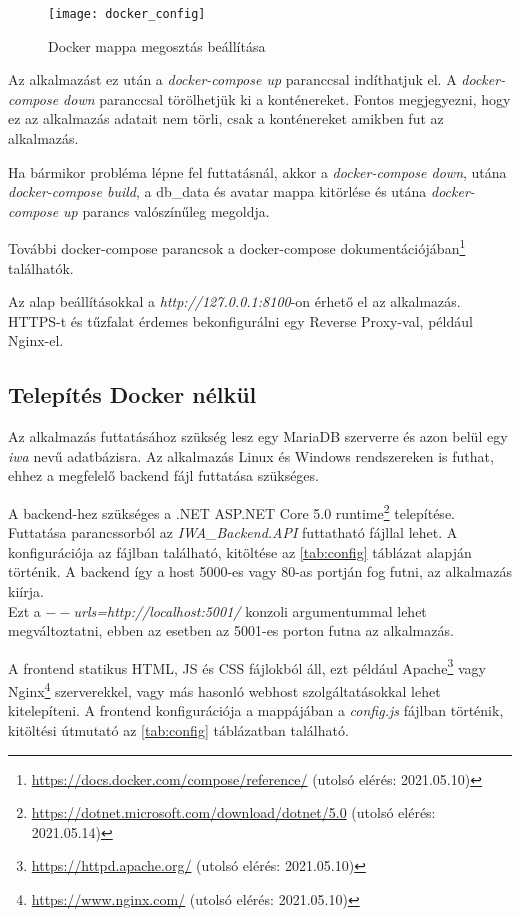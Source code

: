\begin{figure}[H]
    \centering
    \texttt{[image: docker\_config]}
    \caption{Docker mappa megosztás beállítása}
\end{figure}

Az alkalmazást ez után a \textit{docker-compose up} paranccsal indíthatjuk el. A \textit{docker-compose down} paranccsal törölhetjük ki a konténereket. Fontos megjegyezni, hogy ez az alkalmazás adatait nem törli, csak a konténereket amikben fut az alkalmazás.

Ha bármikor probléma lépne fel futtatásnál, akkor a \textit{docker-compose down}, utána \textit{docker-compose build}, a db\_data és avatar mappa kitörlése és utána \textit{docker-compose up} parancs valószínűleg megoldja.

További docker-compose parancsok a docker-compose dokumentációjában\footnote{\url{https://docs.docker.com/compose/reference/} (utolsó elérés: 2021.05.10)} találhatók.

Az alap beállításokkal a \textit{http://127.0.0.1:8100}-on érhető el az alkalmazás. HTTPS-t és tűzfalat érdemes bekonfigurálni egy Reverse Proxy\cite{nginxReverseProxy}-val, például Nginx-el.

\subsection{Telepítés Docker nélkül}

Az alkalmazás futtatásához szükség lesz egy MariaDB szerverre és azon belül egy \textit{iwa} nevű adatbázisra. Az alkalmazás Linux és Windows rendszereken is futhat, ehhez a megfelelő backend fájl futtatása szükséges.

A backend-hez szükséges a .NET ASP.NET Core 5.0 runtime\footnote{\url{https://dotnet.microsoft.com/download/dotnet/5.0} (utolsó elérés: 2021.05.14)} telepítése. Futtatása parancssorból az \textit{IWA\_Backend.API} futtatható fájllal lehet. A konfigurációja az  fájlban található, kitöltése az \ref{tab:config} táblázat alapján történik. A backend így a host 5000-es vagy 80-as portján fog futni, az alkalmazás kiírja. \\ Ezt a \textit{$--$urls=http://localhost:5001/} konzoli argumentummal lehet megváltoztatni, ebben az esetben az 5001-es porton futna az alkalmazás.

A frontend statikus HTML, JS és CSS fájlokból áll, ezt például Apache\footnote{\url{https://httpd.apache.org/} (utolsó elérés: 2021.05.10)} vagy Nginx\footnote{\url{https://www.nginx.com/} (utolsó elérés: 2021.05.10)} szerverekkel, vagy más hasonló webhost szolgáltatásokkal lehet kitelepíteni. A frontend konfigurációja a mappájában a \textit{config.js} fájlban történik, kitöltési útmutató az \ref{tab:config} táblázatban található.

